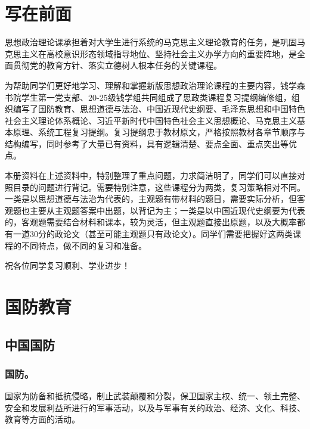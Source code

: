 \documentclass{article}
\begin{document}
\setcounter{tocdepth}{3}
\renewcommand{\contentsname}{\hspace*{\fill}目录\hspace*{\fill}}
\tableofcontents
\newpage
\setcounter{page}{1}

\section*{写在前面}

思想政治理论课承担着对大学生进行系统的马克思主义理论教育的任务，是巩固马克思主义在高校意识形态领域指导地位、坚持社会主义办学方向的重要阵地，是全面贯彻党的教育方针、落实立德树人根本任务的关键课程。

为帮助同学们更好地学习、理解和掌握新版思想政治理论课程的主要内容，钱学森书院学生第一党支部、20-25级钱学组共同组成了思政类课程复习提纲编修组，组织编写了国防教育、思想道德与法治、中国近现代史纲要、毛泽东思想和中国特色社会主义理论体系概论、习近平新时代中国特色社会主义思想概论、马克思主义基本原理、系统工程复习提纲。复习提纲忠于教材原文，严格按照教材各章节顺序与结构编写，同时参考了大量已有资料，具有逻辑清楚、要点全面、重点突出等优点。

本册资料在上述资料中，特别整理了重点问题，力求简洁明了，同学们可以直接对照目录的问题进行背记。需要特别注意，这些课程分为两类，复习策略相对不同。一类是以思想道德与法治为代表的，主观题有带材料的题目，需要实际分析，但客观题也主要从主观题答案中出题，以背记为主；一类是以中国近现代史纲要为代表的，客观题需要结合材料和课本，较为灵活，但主观题直接出原题，以及大概率都有一道30分的政论文（甚至可能主观题只有政论文）。同学们需要把握好这两类课程的不同特点，做不同的复习和准备。

祝各位同学复习顺利、学业进步！



\newpage

\section{国防教育}

\subsection{中国国防}

\subsubsection{国防。}
国家为防备和抵抗侵略，制止武装颠覆和分裂，保卫国家主权、统一、领土完整、安全和发展利益所进行的军事活动，以及与军事有关的政治、经济、文化、科技、教育等方面的活动。
\end{document}
